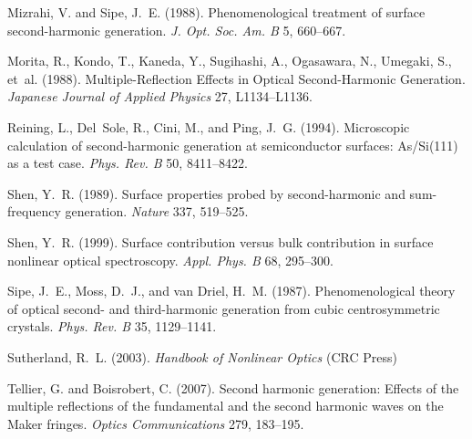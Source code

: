 \documentclass[utf8]{frontiersSCNS}
\begin{document}
\begin{thebibliography}{39}
Mizrahi, V. and Sipe, J.~E. (1988).
\newblock Phenomenological treatment of surface second-harmonic generation.
\newblock \emph{J. Opt. Soc. Am. B} 5, 660--667.
\newblock {}

Morita, R., Kondo, T., Kaneda, Y., Sugihashi, A., Ogasawara, N., Umegaki, S.,
  et~al. (1988).
\newblock Multiple-{Reflection} {Effects} in {Optical} {Second}-{Harmonic}
  {Generation}.
\newblock \emph{Japanese Journal of Applied Physics} 27, L1134--L1136.
\newblock {}

Reining, L., Del~Sole, R., Cini, M., and Ping, J.~G. (1994).
\newblock Microscopic calculation of second-harmonic generation at
  semiconductor surfaces: {As/Si(111)} as a test case.
\newblock \emph{Phys. Rev. B} 50, 8411--8422.
\newblock {}

Shen, Y.~R. (1989).
\newblock Surface properties probed by second-harmonic and sum-frequency
  generation.
\newblock \emph{Nature} 337, 519--525.
\newblock {}

Shen, Y.~R. (1999).
\newblock Surface contribution versus bulk contribution in surface nonlinear
  optical spectroscopy.
\newblock \emph{Appl. Phys. B} 68, 295--300.
\newblock {}

Sipe, J.~E., Moss, D.~J., and van Driel, H.~M. (1987).
\newblock Phenomenological theory of optical second- and third-harmonic
  generation from cubic centrosymmetric crystals.
\newblock \emph{Phys. Rev. B} 35, 1129--1141.
\newblock {}

Sutherland, R.~L. (2003).
\newblock \emph{Handbook of {Nonlinear} {Optics}} (CRC Press)

Tellier, G. and Boisrobert, C. (2007).
\newblock Second harmonic generation: {Effects} of the multiple reflections of
  the fundamental and the second harmonic waves on the {Maker} fringes.
\newblock \emph{Optics Communications} 279, 183--195.
\newblock {}


\end{thebibliography}
\end{document}
